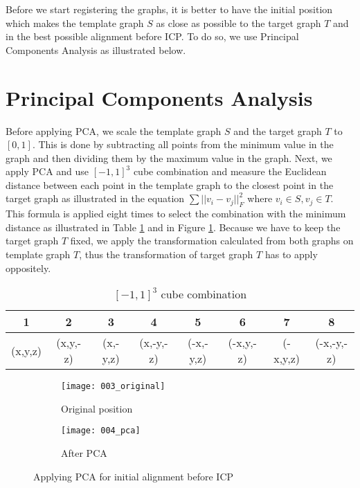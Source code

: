 \documentclass[../structure.tex]{subfiles}
\begin{document}
\hspace{2em}Before we start registering the graphs, it is better to have the initial position which makes the template graph $S$ as close as possible to the target graph $T$ and in the best possible alignment before ICP. To do so, we use Principal Components Analysis as illustrated below.

\section{Principal Components Analysis }
\hspace{2em}Before applying PCA, we scale the template graph $S$ and the target graph $T$ to $[0,1]$. This is done by subtracting all points from the minimum value in the graph and then dividing them by the maximum value in the graph. Next, we apply PCA and use $[-1,1]^3$ cube combination and measure the Euclidean distance between each point in the template graph to the closest point in the target graph as illustrated in the equation $\sum ||v_i-v_j||_F^2$ where $v_i \in S, v_j \in T$. This formula is applied eight times to select the combination with the minimum distance as illustrated in Table \ref{table:cube} and in Figure \ref{fig:pca}. Because we have to keep the target graph $T$ fixed, we apply the transformation calculated from both graphs on template graph $T$, thus the transformation of target graph $T$ has to apply oppositely.
\vspace{2em}
\begin{center}
\begin{table}[h]
	\begin{tabular}{| c | c | c | c | c | c | c | c |}
	\hline
	1 & 2 & 3 & 4 & 5 & 6 & 7 & 8\\
	\hline
	(x,y,z) & (x,y,-z) & (x,-y,z) & (x,-y,-z) & (-x,-y,z) & (-x,y,-z) & (-x,y,z) & (-x,-y,-z)\\
	\hline
	\end{tabular}
\caption{$[-1,1]^3$ cube combination}
\label{table:cube}
\end{table}
\end{center}

\begin{figure}[h!]
	\centering
	\begin{subfigure}[b]{0.59\textwidth}
	\texttt{[image: 003\_original]}
	\caption{Original position}
	\end{subfigure}
	\begin{subfigure}[b]{0.40\textwidth}
	\texttt{[image: 004\_pca]}
	\caption{After PCA}
	\end{subfigure}
\caption{Applying PCA for initial alignment before ICP}
\label{fig:pca}
\end{figure}
\end{document}
